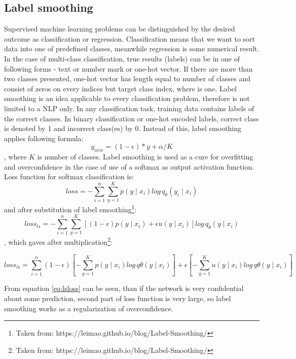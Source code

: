 \subsection{Label smoothing}
Supervised machine learning problems can be distinguished by the desired outcome as classification or regression. Classification means that we want to sort data into one of predefined classes, meanwhile regression is some numerical result. In the case of multi-class classification, true results (labels) can be in one of following forms -  text or number mark or one-hot vector. If there are more than two classes presented, one-hot vector has length equal to number of classes and consist of zeros on every indices but target class index, where is one. %
Label smoothing is an idea applicable to every classification problem, therefore is not limited to a NLP only. %
In any classification task, training data contains labels of the correct classes. In binary classification or one-hot encoded labels, correct class is denoted by 1 and incorrect class(es) by 0. Instead of this, label smoothing applies following formula: 
$$y_{new} = (1 - \epsilon) * y + \alpha / K$$, where $K$ is number of classes. Label smoothing is used as a cure for overfitting and overconfidence in the case of use of a softmax 
 as output activation function. Loss function for softmax classification is: 
 $$ loss = -\sum_{i=1}^{n} \sum_{y=1}^{K} p(y \mid x_i) log \, q_{\theta} ( y_i \mid x_i ) $$
 and after substitution of label smoothing\footnote{Taken from: https://leimao.github.io/blog/Label-Smoothing/}:
$$
loss_{ls} = -\sum_{i=1}^{n} \sum_{y=1}^{K} [(1-\epsilon) p(y \mid x_i)+\epsilon u(y\mid x_i)]log \, q_\theta(y \mid x_i) $$,
which gaves after multiplication\footnote{Taken from: https://leimao.github.io/blog/Label-Smoothing/}:

 \begin{equation} \label{eq:lsloss}
 loss_{ls}= \sum_{i=1}^{n} {(1- \epsilon)[- \sum_{y=1}^{K} p(y\mid x_i) log \, q\theta(y \mid x_i)]+\epsilon [- \sum_{y=1}^{K} u(y \mid x_i)log \, q\theta (y\mid x_i)]}
 \end{equation}
 
From equation \ref{eq:lsloss} can be seen, than if the network is very confidential about some prediction, second part of loss function is very large, so label smoothing works as a regularization of overconfidence.


